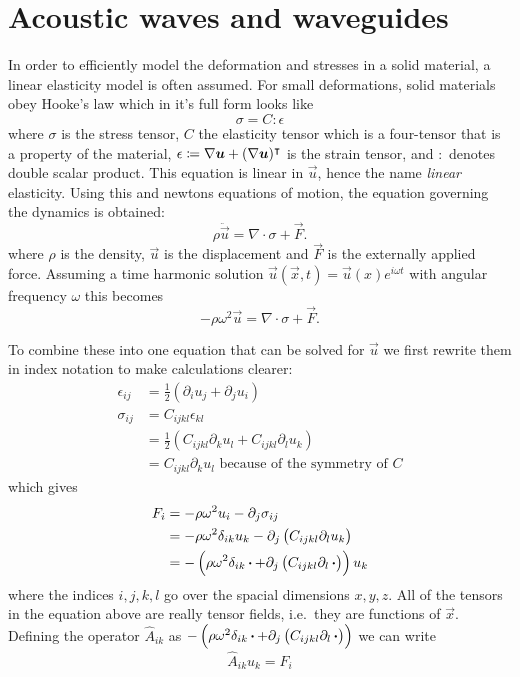 \chapter{Acoustic waves and waveguides}

In order to efficiently model the deformation and stresses in a solid material,
a linear elasticity model is often assumed.
For small deformations, solid materials obey Hooke's law which in it's full form
looks like
\[
	\sigma = C : \epsilon
\]
where $\sigma$ is the stress tensor, $C$ the elasticity tensor which is a
four-tensor that is a property of the material,
$\epsilon \coloneqq \nabla \bm u + (\nabla \bm u)^\intercal$
is the strain tensor, and $:$ denotes double scalar product.
This equation is linear in $\vec u$, hence the name \emph{linear} elasticity.
Using this and newtons equations of motion, the equation governing the dynamics
is obtained:
\[
	\rho \ddot{\vec{u}} = \nabla \cdot \sigma + \vec F.
\]
where $\rho$ is the density, $\vec{u}$ is the displacement and $\vec F$ is the
externally applied force.
Assuming a time harmonic solution
$\vec u(\vec x, t) = \vec u(x) e^{i \omega t}$
with angular frequency $\omega$ this becomes
\[
	-\rho \omega^2 \vec{u} = \nabla \cdot \sigma + \vec F.
\]

To combine these into one equation that can be solved for $\vec{u}$ we first
rewrite them in index notation to make calculations clearer:
\begin{align}
	\epsilon_{ij} &= \frac12(\partial_i u_j + \partial_j u_i)\\
	\sigma_{ij} &= C_{ijkl} \epsilon_{kl}\\
				&= \frac12\left(C_{ijkl} \partial_k u_l + C_{ijkl} \partial_l
				u_k\right)\\
				&= C_{ijkl} \partial_k u_l\text{ because of the symmetry of $C$}
\end{align}
which gives
\begin{align}
	F_{i} &= -\rho \omega^2 u_{i} - \partial_j \sigma_{ij}\\
		   &= -\rho \omega^2 \delta_{ik} u_{k} -
		   \partial_j \left(C_{ijkl} \partial_l u_k\right)\\
		   &= -\left(\rho \omega^2 \delta_{ik} \operatorname{\boldsymbol{\cdot}} + 
		   \partial_j \left(C_{ijkl} \partial_l \operatorname{\boldsymbol{\cdot}}\right)\right) u_k
\end{align}
where the indices $i,j,k,l$ go over the spacial dimensions $x,y,z$.
All of the tensors in the equation above are really tensor fields, i.e.\ they are
functions of $\vec{x}$.
Defining the operator $\hat A_{ik}$ as
$-\left(\rho \omega^2 \delta_{ik} \operatorname{\boldsymbol{\cdot}} + 
\partial_j \left(C_{ijkl} \partial_l \operatorname{\boldsymbol{\cdot}}\right)\right)$
we can write
\begin{equation}\label{eq:gov_eq}
	\hat A_{ik} u_k = F_i
\end{equation}


